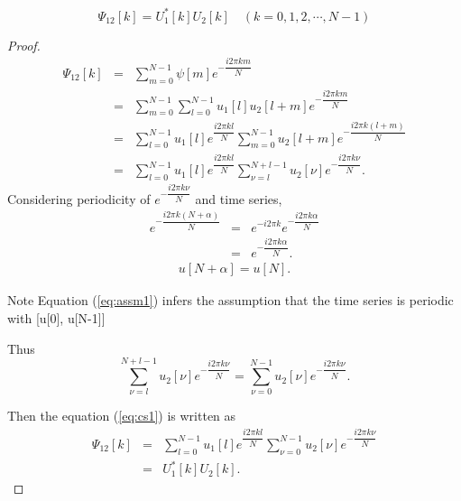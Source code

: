 \documentclass{proposal}
\begin{document}
\begin{lemma}
\begin{equation}
\Psi_{12}[k] = U_1^*[k]U_2[k] \quad (k =0, 1, 2, \cdots, N-1)
\end{equation}
\end{lemma}

\begin{proof}
\begin{eqnarray}
\Psi_{12}[k] &=& \sum_{m=0}^{N-1}\psi[m]e^{-\dfrac{i2\pi km}{N}}   \\
&=& \sum_{m=0}^{N-1} \sum_{l=0}^{N-1}u_1[l]u_2[l+m] e^{-\dfrac{i2\pi km}{N}}\\
&=& \sum_{l=0}^{N-1} u_1[l] e^{\dfrac{i2\pi kl}{N}} \sum_{m=0}^{N-1}u_2[l+m] e^{-\dfrac{i2\pi k(l+m)}{N}}\\
\label{eq:cs1}
&=& \sum_{l=0}^{N-1} u_1[l] e^{\dfrac{i2\pi kl}{N}} \sum_{\nu=l}^{N+l-1}u_2[\nu] e^{-\dfrac{i2\pi k\nu}{N}}.
\end{eqnarray}
Considering periodicity of $e^{-\dfrac{i2\pi k\nu}{N}}$ and time series,
\begin{eqnarray}
e^{-\dfrac{i2\pi k(N+\alpha)}{N}} &=& e^{-i2\pi k} e ^{-\dfrac{i2\pi k\alpha}{N}}\\
&=& e ^{-\dfrac{i2\pi k\alpha}{N}}.
\end{eqnarray}
\begin{eqnarray}
u[N+\alpha] = u[N].
\label{eq:assm1}
\end{eqnarray}

\begin{itembox}[l]{Note}
Equation (\ref{eq:assm1}) infers the assumption that the time series is periodic with [u[0], u[N-1]]
\end{itembox}

Thus
\begin{equation}
\sum_{\nu=l}^{N+l-1}u_2[\nu] e^{-\dfrac{i2\pi k\nu}{N}} = \sum_{\nu=0}^{N-1}u_2[\nu] e^{-\dfrac{i2\pi k\nu}{N}}.
\end{equation}


Then the equation (\ref{eq:cs1}) is written as
\begin{eqnarray}
\Psi_{12}[k] &=& \sum_{l=0}^{N-1} u_1[l] e^{\dfrac{i2\pi kl}{N}} \sum_{\nu=0}^{N-1}u_2[\nu] e^{-\dfrac{i2\pi k\nu}{N}}\\
&=&  U_1^*[k]U_2[k].
\end{eqnarray}

\end{proof}
  

%
\end{document}
